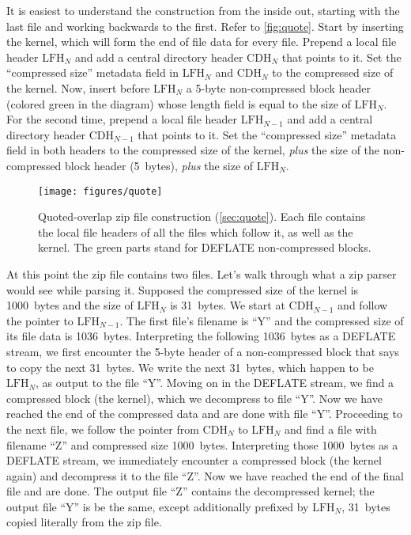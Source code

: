 \documentclass[letterpaper,twocolumn,10pt]{article}
\newcommand{\CDH}{\mathrm{CDH}}
\newcommand{\LFH}{\mathrm{LFH}}
\begin{document}
It is easiest to understand the construction from the inside out,
starting with the last file and working backwards to the first.
Refer to \autoref{fig:quote}.
Start by inserting the kernel, which will form the end of file data for every file.
Prepend a local file header $\LFH_N$
and add a central directory header $\CDH_N$ that points to it.
Set the ``compressed size'' metadata field in $\LFH_N$ and $\CDH_N$ to the compressed size of the kernel.
Now, insert before $\LFH_N$ a 5-byte non-compressed block header (colored green in the diagram)
whose length field is equal to the size of $\LFH_N$.
For the second time,
prepend a local file header $\LFH_{N-1}$
and add a central directory header $\CDH_{N-1}$ that points to it.
Set the ``compressed size'' metadata field in both headers to the compressed size of the kernel,
\emph{plus} the size of the non-compressed block header (\SI{5}{bytes}),
\emph{plus} the size of $\LFH_N$.

\begin{figure*}
\texttt{[image: figures/quote]}
\caption{
Quoted-overlap zip file construction
(\autoref{sec:quote}).
Each file contains the local file headers of all the files which follow it,
as well as the kernel.
The green parts stand for DEFLATE non-compressed blocks.
}
\label{fig:quote}
\end{figure*}

At this point the zip file contains two files.
Let's walk through what a zip parser would see while parsing it.
Supposed the compressed size of the kernel is \SI{1000}{bytes}
and the size of $\LFH_N$ is \SI{31}{bytes}.
We start at $\CDH_{N-1}$
and follow the pointer to $\LFH_{N-1}$.
The first file's filename is ``Y'' and
the compressed size of its file data is \SI{1036}{bytes}.
Interpreting the following \SI{1036}{bytes} as a DEFLATE stream,
we first encounter the 5-byte header of a non-compressed block
that says to copy the next \SI{31}{bytes}.
We write the next \SI{31}{bytes},
which happen to be $\LFH_N$,
as output to the file ``Y''.
Moving on in the DEFLATE stream, we find a compressed block (the kernel),
which we decompress to file ``Y''.
Now we have reached the end of the compressed data and are done with file ``Y''.
Proceeding to the next file, we follow the pointer from $\CDH_N$
to $\LFH_N$ and find a file with filename ``Z''
and compressed size \SI{1000}{bytes}.
Interpreting those \SI{1000}{bytes} as a DEFLATE stream,
we immediately encounter a compressed block (the kernel again)
and decompress it to the file ``Z''.
Now we have reached the end of the final file and are done.
The output file ``Z'' contains the decompressed kernel;
the output file ``Y'' is be the same, except additionally prefixed by
$\LFH_N$, \SI{31}{bytes} copied literally from the zip file.
\end{document}
